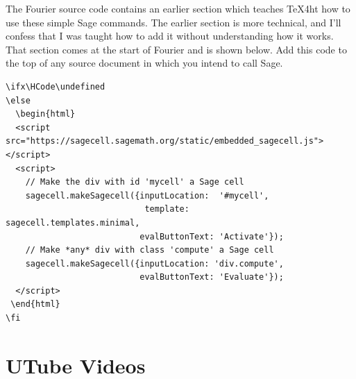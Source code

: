 \documentclass[11pt, oneside]{article}   	%
\begin{document}
 The Fourier source code contains an earlier section which teaches TeX4ht
how to use these simple Sage commands. The earlier section is more technical, and I'll confess
that I was taught how to add it without understanding how it works. That section comes at the
start of Fourier and is shown below. Add this code to the top of any source document in
which you intend to call Sage.

\begin{verbatim}
\ifx\HCode\undefined
\else
  \begin{html}
  <script src="https://sagecell.sagemath.org/static/embedded_sagecell.js"></script>
  <script>
    // Make the div with id 'mycell' a Sage cell
    sagecell.makeSagecell({inputLocation:  '#mycell',
                            template:       sagecell.templates.minimal,
                           evalButtonText: 'Activate'});
    // Make *any* div with class 'compute' a Sage cell
    sagecell.makeSagecell({inputLocation: 'div.compute',
                           evalButtonText: 'Evaluate'});
  </script>
 \end{html}
\fi
\end{verbatim}


\section{UTube Videos}
\end{document}
